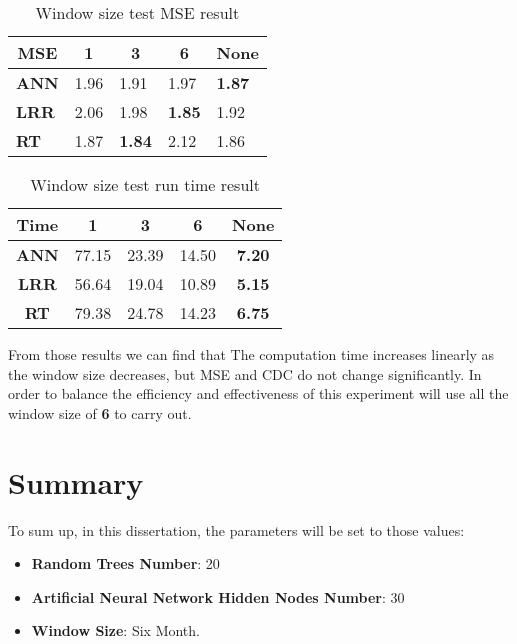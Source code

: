 \begin{table}[h]
	\centering
	\begin{tabular}{|l|l|l|l|l|}
		\hline
		\multicolumn{1}{|c|}{\textbf{MSE}} & \multicolumn{1}{c|}{\textbf{1}} & \multicolumn{1}{c|}{\textbf{3}} & \multicolumn{1}{c|}{\textbf{6}} & \multicolumn{1}{c|}{\textbf{None}} \\ \hline
		\textbf{ANN}                       & 1.96                            & 1.91                            & 1.97                            & \textbf{1.87}                      \\ \hline
		\textbf{LRR}                       & 2.06                            & 1.98                            & \textbf{1.85}                   & 1.92                               \\ \hline
		\textbf{RT}                        & 1.87                            & \textbf{1.84}                   & 2.12                            & 1.86                               \\ \hline
	\end{tabular}
	\caption{Window size test MSE result}
	\label{fg:windowSizeMSE}
\end{table}

\begin{table}[h]
	\centering
	\begin{tabular}{|c|c|c|c|c|}
		\hline
		\textbf{Time} & \textbf{1} & \textbf{3} & \textbf{6} & \textbf{None} \\ \hline
		\textbf{ANN}  & 77.15      & 23.39      & 14.50      & \textbf{7.20} \\ \hline
		\textbf{LRR}  & 56.64      & 19.04      & 10.89      & \textbf{5.15} \\ \hline
		\textbf{RT}   & 79.38      & 24.78      & 14.23      & \textbf{6.75} \\ \hline
	\end{tabular}
	\caption{Window size test run time result}
	\label{fg:windowSizeRunTime}
\end{table}


From those results we can find that The computation time increases linearly as the window size decreases, but MSE and CDC do not change significantly. In order to balance the efficiency and effectiveness of this experiment will use all the window size of \textbf{6} to carry out.


\section{Summary}
To sum up, in this dissertation, the parameters will be set to those values:
\begin{itemize}
	\item \textbf{Random Trees Number}: 20
	\item \textbf{Artificial Neural Network Hidden Nodes Number}: 30
	\item \textbf{Window Size}: Six Month.
\end{itemize}
